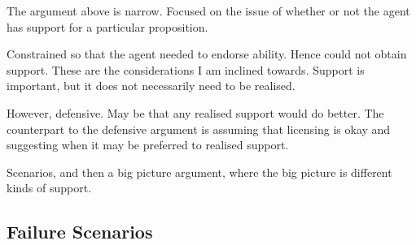 \documentclass[10pt]{article}
\begin{document}
The argument above is narrow.
Focused on the issue of whether or not the agent has support for a particular proposition.

Constrained so that the agent needed to endorse ability.
Hence could not obtain support.
These are the considerations I am inclined towards.
Support is important, but it does not necessarily need to be realised.

However, defensive.
May be that any realised support would do better.
The counterpart to the defensive argument is assuming that licensing is okay and suggesting when it may be preferred to realised support.

Scenarios, and then a big picture argument, where the big picture is different kinds of support.

\subsection{Failure Scenarios}
\label{sec:failure-scenarios}
\end{document}
